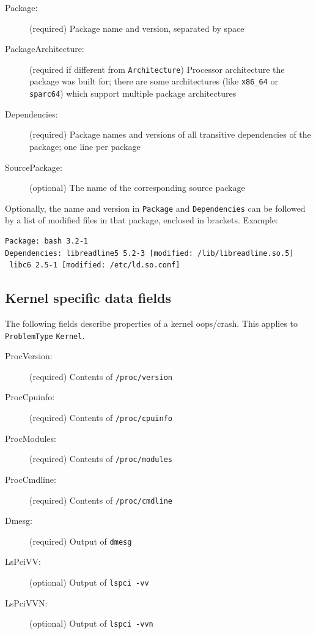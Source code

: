 \documentclass[DIV12,halfparskip]{scrartcl}
\begin{document}
\begin{description}
    \item [Package:] (required) Package name and version, separated by space

    \item [PackageArchitecture:] (required if different from
    \verb!Architecture!) Processor architecture the package
    was built for; there are some architectures (like \verb!x86_64! or
    \verb!sparc64!) which support multiple package architectures

    \item [Dependencies:] (required) Package names and versions of all
    transitive dependencies of the package; one line per package

    \item [SourcePackage:] (optional) The name of the corresponding source package
\end{description}

Optionally, the name and version in \verb!Package! and \verb!Dependencies! can
be followed by a list of modified files in that package, enclosed in brackets.
Example:

\begin{verbatim}
Package: bash 3.2-1
Dependencies: libreadline5 5.2-3 [modified: /lib/libreadline.so.5]
 libc6 2.5-1 [modified: /etc/ld.so.conf]
\end{verbatim}

\subsection{Kernel specific data fields}

The following fields describe properties of a kernel oops/crash.
This applies to \verb!ProblemType! \verb!Kernel!.

\begin{description}
    \item [ProcVersion:] (required) Contents of \verb!/proc/version!
    \item [ProcCpuinfo:] (required) Contents of \verb!/proc/cpuinfo!
    \item [ProcModules:] (required) Contents of \verb!/proc/modules!
    \item [ProcCmdline:] (required) Contents of \verb!/proc/cmdline!
    \item [Dmesg:] (required) Output of \verb!dmesg!
    \item [LsPciVV:] (optional) Output of \verb!lspci -vv!
    \item [LsPciVVN:] (optional) Output of \verb!lspci -vvn!
\end{description}
\end{document}
